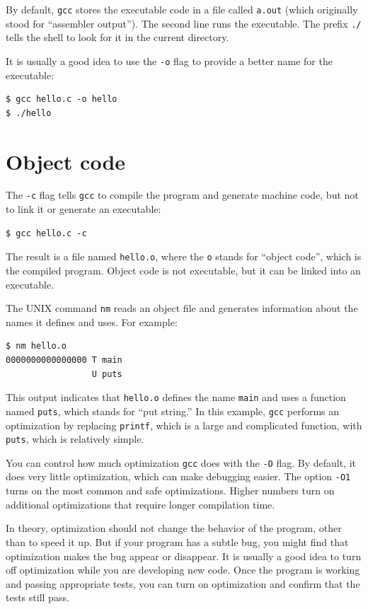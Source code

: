 \documentclass[12pt]{book}
\begin{document}
By default, {\tt gcc} stores the executable code in a file
called {\tt a.out} (which originally stood for ``assembler output'').
The second line runs the executable.  The prefix \verb"./" tells
the shell to look for it in the current directory.

It is usually a good idea to use the {\tt -o} flag to provide a
better name for the executable:

\begin{verbatim}
$ gcc hello.c -o hello
$ ./hello
\end{verbatim}


\section{Object code}

The {\tt -c} flag tells {\tt gcc} to compile the program and
generate machine code, but not to link it or generate an executable:

\begin{verbatim}
$ gcc hello.c -c
\end{verbatim}

The result is a file named {\tt hello.o}, where the {\tt o} stands for
``object code'', which is the compiled program.  Object code is not
executable, but it can be linked into an executable.

The UNIX command {\tt nm} reads an object file and generates
information about the names it defines and uses.  For example:

\begin{verbatim}
$ nm hello.o
0000000000000000 T main
                 U puts
\end{verbatim}

This output indicates that {\tt hello.o} defines the name {\tt main}
and uses a function named {\tt puts}, which stands for ``put string.''
In this example, {\tt gcc} performs an optimization by replacing
{\tt printf}, which is a large and complicated function, with
{\tt puts}, which is relatively simple.

You can control how much optimization {\tt gcc} does with
the {\tt -O} flag.  By default, it does very little optimization, which
can make debugging easier.  The option {\tt -O1} turns on the most
common and safe optimizations.  Higher numbers turn on additional
optimizations that require longer compilation time.

In theory, optimization should not change the behavior of the program,
other than to speed it up.  But if your program has a subtle bug,
you might find that optimization makes the bug appear or disappear.
It is usually a good idea to turn off optimization while you are developing
new code.  Once the program is working and passing appropriate tests,
you can turn on optimization and confirm that the tests still pass.
\end{document}

